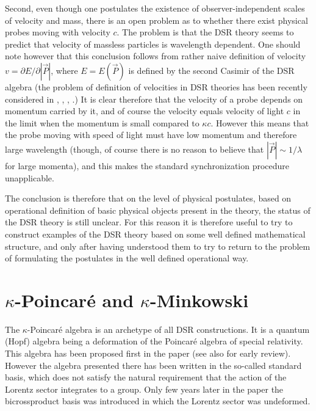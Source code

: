 \documentclass[a4paper,a4paper]{article}
\begin{document}
Second, even though one postulates the existence of observer-independent scales of velocity and mass,  there is an open problem as to whether there exist physical probes moving with velocity $c$. The problem is that the DSR theory seems to predict that velocity of massless particles is wavelength dependent. One should note however that this conclusion follows from rather naive definition of velocity $v = \partial E/\partial | \vec{P} |$, where $E = E(\vec{P})$ is defined by the second Casimir of the DSR algebra (the problem of definition of velocities in DSR theories has been recently considered in \cite{luknowv}, \cite{rs}, \cite{granik}, \cite{THMT}.) It is clear therefore that the velocity of a probe depends on  momentum carried by it, and of course the velocity equals velocity of light $c$ in the limit when the momentum is small compared to $\kappa c$. However this means that the probe moving with speed of light must have low momentum and therefore large wavelength (though, of course there is no reason to believe that $| \vec{P} | \sim 1/\lambda$ for large momenta), and this makes the standard synchronization procedure unapplicable.

The conclusion is therefore that on the level of physical postulates, based on operational definition of basic physical objects present in the theory, the status of the DSR theory is still unclear. For this reason it is therefore useful to try to construct examples of the DSR theory based on some well defined mathematical structure, and only after having understood them to try to return to the problem of formulating the postulates in the well defined operational way.


\section{$\kappa$-Poincar\'e and $\kappa$-Minkowski} 

The $\kappa$-Poincar\'e  algebra is an archetype of all DSR constructions. It is a quantum (Hopf) algebra being a deformation of the Poincar\'e algebra of special relativity. This algebra has been proposed first in the paper \cite{lunoruto} (see also \cite{rurev} for early review). However the algebra presented there has been written in the so-called standard basis, which does not satisfy the natural requirement that the action of the Lorentz sector integrates to a group. Only few years later in the paper \cite{maru} the bicrossproduct basis was introduced in which the Lorentz sector was undeformed. 
\end{document}
